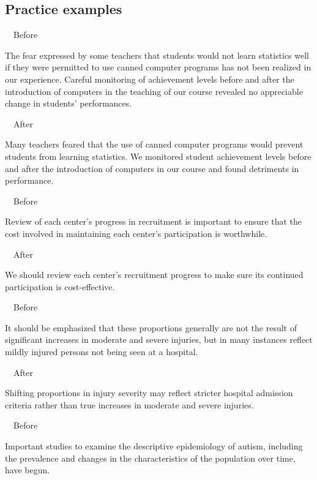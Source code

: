 \documentclass[a4paper, 12pt]{article}
\begin{document}
\newpage\subsection{Practice examples}

\par\ \textbullet\ Before
\par The fear expressed by some teachers that students would not learn statistics well if they were permitted to use canned computer programs has not been realized in our experience. Careful monitoring of achievement levels before and after the introduction of computers in the teaching of our course revealed no appreciable change in students’ performances.

\par\ \textbullet\ After
\par Many teachers feared that the use of canned computer programs would prevent students from learning statistics. We monitored student achievement levels before and after the introduction of computers in our course and found detriments in performance.

\par\ \textbullet\ Before
\par Review of each center’s progress in recruitment is important to ensure that the cost involved in maintaining each center’s participation is worthwhile.

\par\ \textbullet\ After
\par We should review each center's recruitment progress to make sure its continued participation is cost-effective.

\par\ \textbullet\ Before
\par It should be emphasized that these proportions generally are not the result of significant increases in moderate and severe injuries, but in many instances reflect mildly injured persons not being seen at a hospital.

\par\ \textbullet\ After
\par Shifting proportions in injury severity may reflect stricter hospital admission criteria rather than true increases in moderate and severe injuries.

\par\ \textbullet\ Before
\par Important studies to examine the descriptive epidemiology of autism, including the prevalence and changes in the characteristics of the population over time, have begun.
\end{document}
